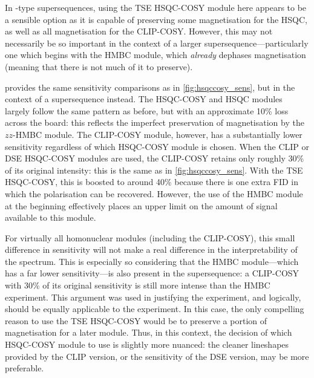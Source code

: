 In -type supersequences, using the TSE HSQC-COSY module here appears to be a sensible option as it is capable of preserving some  magnetisation for the HSQC, as well as all  magnetisation for the CLIP-COSY.
However, this may not necessarily be so important in the context of a larger supersequence---particularly one which begins with the HMBC module, which \textit{already} dephases  magnetisation (meaning that there is not much of it to preserve).

 provides the same sensitivity comparisons as in \cref{fig:hsqccosy_sens}, but in the context of a  supersequence instead.
The HSQC-COSY and HSQC modules largely follow the same pattern as before, but with an approximate 10\% loss across the board: this reflects the imperfect preservation of  magnetisation by the $zz$-HMBC module.
The CLIP-COSY module, however, has a substantially lower sensitivity regardless of which HSQC-COSY module is chosen.
When the CLIP or DSE HSQC-COSY modules are used, the CLIP-COSY retains only roughly 30\% of its original intensity: this is the same as in \cref{fig:hsqccosy_sens}.
With the TSE HSQC-COSY, this is boosted to around 40\% because there is one extra FID in which the  polarisation can be recovered.
However, the use of the HMBC module at the beginning effectively places an upper limit on the amount of signal available to this module.

For virtually all homonuclear modules (including the CLIP-COSY), this small difference in sensitivity will not make a real difference in the interpretability of the spectrum.
This is especially so considering that the HMBC module---which has a far lower sensitivity---is also present in the supersequence:
a CLIP-COSY with 30\% of its original sensitivity is still more intense than the HMBC experiment.
This argument was used in justifying the  experiment, and logically, should be equally applicable to the  experiment.
In this case, the only compelling reason to use the TSE HSQC-COSY would be to preserve a portion of  magnetisation for a later \carbon{} module.
Thus, in this context, the decision of which HSQC-COSY module to use is slightly more nuanced: the cleaner lineshapes provided by the CLIP version, or the sensitivity of the DSE version, may be more preferable.
